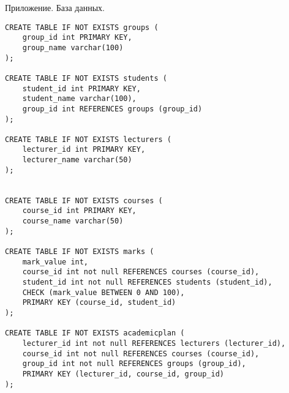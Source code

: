 \documentclass[12pt]{article}
\begin{document}
Приложение. База данных.
\begin{verbatim}
CREATE TABLE IF NOT EXISTS groups (
	group_id int PRIMARY KEY,
	group_name varchar(100)
);

CREATE TABLE IF NOT EXISTS students (
	student_id int PRIMARY KEY,
	student_name varchar(100),
	group_id int REFERENCES groups (group_id)
);

CREATE TABLE IF NOT EXISTS lecturers (
	lecturer_id int PRIMARY KEY,
	lecturer_name varchar(50)
);


CREATE TABLE IF NOT EXISTS courses (
	course_id int PRIMARY KEY,
	course_name varchar(50)
);

CREATE TABLE IF NOT EXISTS marks (
	mark_value int,
	course_id int not null REFERENCES courses (course_id),
	student_id int not null REFERENCES students (student_id),
	CHECK (mark_value BETWEEN 0 AND 100),
	PRIMARY KEY (course_id, student_id)
);

CREATE TABLE IF NOT EXISTS academicplan (
	lecturer_id int not null REFERENCES lecturers (lecturer_id),
	course_id int not null REFERENCES courses (course_id),
	group_id int not null REFERENCES groups (group_id),
	PRIMARY KEY (lecturer_id, course_id, group_id)
);
\end{verbatim}
\end{document}
